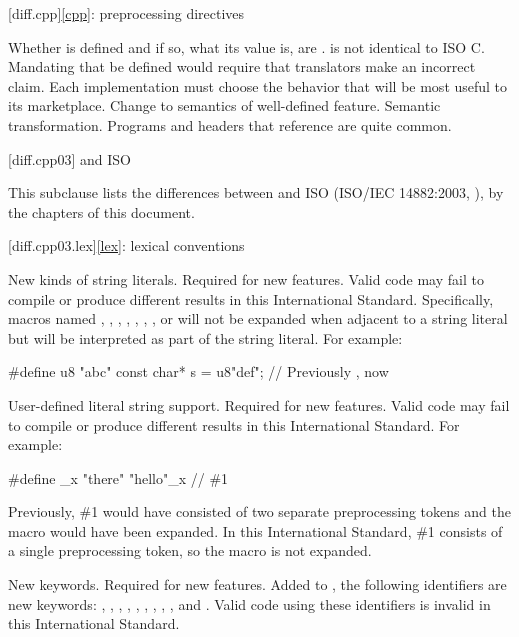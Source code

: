 [diff.cpp]{\ref{cpp}: preprocessing directives}

\change
Whether  is defined and if so, what its value is, are
.
\rationale
\Cpp{} is not identical to ISO C\@.
Mandating that 
be defined would require that translators make an incorrect claim.
Each implementation must choose the behavior that will be most
useful to its marketplace.
\effect
Change to semantics of well-defined feature.
\difficulty
Semantic transformation.
\howwide
Programs and headers that reference  are
quite common.

[diff.cpp03]{\Cpp{} and ISO \CppIII{}}

\pnum
{}%
This subclause lists the differences between \Cpp{} and
ISO \CppIII{} (ISO/IEC 14882:2003, ),
by the chapters of this document.

[diff.cpp03.lex]{\ref{lex}: lexical conventions}

\change
New kinds of string literals.
\rationale
Required for new features.
\effect
Valid \CppIII{} code may fail to compile or produce different results in
this International Standard. Specifically, macros named , ,
, , , , , or  will
not be expanded when adjacent to a string literal but will be interpreted as
part of the string literal. For example:
\begin{codeblock}
#define u8 "abc"
const char* s = u8"def";        // Previously , now 
\end{codeblock}

\change
User-defined literal string support.
\rationale
Required for new features.
\effect
Valid \CppIII{} code may fail to compile or produce different results in
this International Standard.
For example:
\begin{codeblock}
#define _x "there"
"hello"_x           // \#1
\end{codeblock}

Previously, \#1 would have consisted of two separate preprocessing tokens and
the macro  would have been expanded. In this International Standard,
\#1 consists of a single preprocessing token, so the macro is not expanded.

\change
New keywords.
\rationale
Required for new features.
\effect
Added to , the following identifiers are new keywords:
,
,
,
,
,
,
,
,
,
and
.
Valid \CppIII{} code using these identifiers is invalid in this International
Standard.

